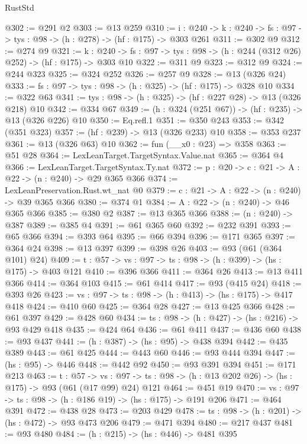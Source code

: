 \begin{lexlean}{RustStd}
\begin{coremodule}
@302 := @291 @2
@303 := @13 @259
@310 := {i : @240} ->
  {k : @240} -> {fs : @97} -> {tys : @98} -> (h : @278) -> (hf : @175) -> @303 @261
@311 := @302 @9
@312 := @274 @9
@321 := {k : @240} ->
  {fs : @97} -> {tys : @98} -> (h : @244 (@312 @26) @252) -> (hf : @175) -> @303 @10
@322 := @311 @9
@323 := @312 @9
@324 := @244 @323
@325 := @324 @252
@326 := @257 @9
@328 := @13 (@326 @24)
@333 := {fs : @97} -> {tys : @98} -> (h : @325) -> (hf : @175) -> @328 @10
@334 := @322 @63
@341 := {tys : @98} -> (h : @325) -> (hf : @227 @28) -> @13 (@326 @218) @10
@342 := @334 @67
@349 := (h : @324 (@251 @67)) -> (hf : @235) -> @13 (@326 @226) @10
@350 := Eq.refl.{1}
@351 := @350 @243
@353 := @342 (@351 @323)
@357 := (hf : @239) -> @13 (@326 @233) @10
@358 := @353 @237
@361 := @13 (@326 @63) @10
@362 := fun (__x0 : @23) => @358
@363 := @51 @28
@364 := LexLeanTarget.TargetSyntax.Value.nat
@365 := @364 @4
@366 := LexLeanTarget.TargetSyntax.Ty.nat
@372 := {p : @20} -> {c : @21} -> {A : @22} -> (n : @240) -> @29 @365 @366
@374 := LexLeanPreservation.Rust.wt_nat @0
@379 := {c : @21} -> {A : @22} -> (n : @240) -> @39 @365 @366
@380 := @374 @1
@384 := {A : @22} -> (n : @240) -> @46 @365 @366
@385 := @380 @2
@387 := @13 @365 @366
@388 := (n : @240) -> @387
@389 := @385 @4
@391 := @61 @365 @60
@392 := @232 @391
@393 := @65 @366
@394 := @393 @64
@395 := @66 @394
@396 := @171 @365
@397 := @364 @24
@398 := @13 @397
@399 := @398 @26
@403 := @93 (@61 (@364 @101) @24)
@409 := {t : @57} -> {vs : @97} -> {ts : @98} -> (h : @399) -> (hs : @175) -> @403 @121
@410 := @396 @366
@411 := @364 @26
@413 := @13 @411 @366
@414 := @364 @103
@415 := @61 @414
@417 := @93 (@415 @24)
@418 := @393 @26
@423 := {vs : @97} -> {ts : @98} -> (h : @413) -> (hs : @175) -> @417 @418
@424 := @410 @60
@425 := @364 @28
@427 := @13 @425 @366
@428 := @61 @397
@429 := @428 @60
@434 := {ts : @98} -> (h : @427) -> (hs : @216) -> @93 @429 @418
@435 := @424 @64
@436 := @61 @411
@437 := @436 @60
@438 := @93 @437
@441 := (h : @387) -> (hs : @95) -> @438 @394
@442 := @435 @389
@443 := @61 @425
@444 := @443 @60
@446 := @93 @444 @394
@447 := (hs : @95) -> @446
@448 := @442 @92
@450 := @93 @391 @394
@451 := @171 @213
@463 := {t : @57} ->
  {vs : @97} -> {ts : @98} -> (h : @13 @202 @26) -> (hs : @175) -> @93 (@61 (@17 @99) @24) @121
@464 := @451 @19
@470 := {vs : @97} -> {ts : @98} -> (h : @186 @19) -> (hs : @175) -> @191 @206
@471 := @464 @391
@472 := @438 @28
@473 := @203 @429
@478 := {ts : @98} -> (h : @201) -> (hs : @472) -> @93 @473 @206
@479 := @471 @394
@480 := @217 @437
@481 := @93 @480
@484 := (h : @215) -> (hs : @446) -> @481 @395

\end{coremodule}
\end{lexlean}
